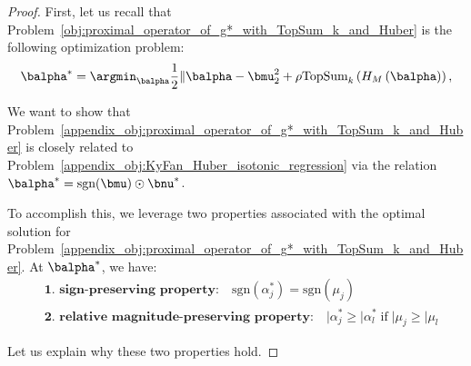 \begin{proof}
    First, let us recall that Problem~\eqref{obj:proximal_operator_of_g*_with_TopSum_k_and_Huber} is the following optimization problem:
    \begin{align}
        \label{appendix_obj:proximal_operator_of_g*_with_TopSum_k_and_Huber}
        \balpha^* = \argmin_{\balpha} \frac{1}{2} \Vert{\balpha - \bmu}_2^2 + \rho \text{TopSum}_k\left( H_M\left( \balpha \right) \right),
    \end{align}
    
    We want to show that Problem~\eqref{appendix_obj:proximal_operator_of_g*_with_TopSum_k_and_Huber} is closely related to Problem~\eqref{appendix_obj:KyFan_Huber_isotonic_regression} via the relation $\balpha^* = \text{sgn}(\bmu) \odot \bnu^*$.
    
    
    To accomplish this, we leverage two properties associated with the optimal solution for Problem~\eqref{appendix_obj:proximal_operator_of_g*_with_TopSum_k_and_Huber}.
    At $\balpha^*$, we have:
    \begin{align}
        & \textbf{1. sign-preserving property:} \quad \text{sgn}(\alpha_j^*) = \text{sgn}(\mu_j) \label{appendix_property:sign_preserving}\\
        & \textbf{2. relative magnitude-preserving property:} \quad \vert{\alpha_j^*} \geq \vert{\alpha_l^*} \; \text{if} \; \vert{\mu_j} \geq \vert{\mu_l} \label{appendix_property:relative_magnitude_preserving}
    \end{align}
    
    Let us explain why these two properties hold.
    

\end{proof}
